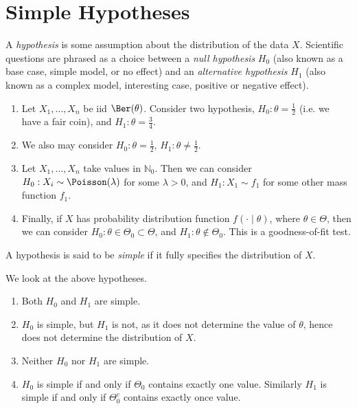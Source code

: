 \documentclass[12pt]{article}
\begin{document}
\newpage

\section{Simple Hypotheses}
\label{sec:simple_hypotheses}

A \emph{hypothesis} is some assumption about the distribution of the data $X$. Scientific questions are phrased as a choice between a \emph{null hypothesis} $H_0$ (also known as a base case, simple model, or no effect) and an \emph{alternative hypothesis} $H_1$ (also known as a complex model, interesting case, positive or negative effect).

\begin{exbox}
	\begin{enumerate}
	\item Let $X_1, \ldots, X_n$ be iid $\Ber(\theta)$. Consider two hypothesis, $H_0 : \theta = \frac{1}{2}$ (i.e. we have a fair coin), and $H_1 : \theta = \frac{3}{4}$.
	\item We also may consider $H_0 : \theta = \frac{1}{2}$, $H_1 : \theta \neq \frac{1}{2}$.
	\item Let $X_1, \ldots, X_n$ take values in $\mathbb{N}_{0}$. Then we can consider $H_0 : X_i \sim \Poisson(\lambda)$ for some $\lambda > 0$, and $H_1 : X_1 \sim f_1$ for some other mass function $f_1$.
	\item Finally, if $X$ has probability distribution function $f(\cdot \mid \theta)$, where $\theta \in \Theta$, then we can consider $H_0 : \theta \in \Theta_0 \subset \Theta$, and $H_1 : \theta \not \in \Theta_0$. This is a goodness-of-fit test.
	\end{enumerate}
\end{exbox}

A hypothesis is said to be \emph{simple} if it fully specifies the distribution of $X$.

\begin{exbox}
	We look at the above hypotheses.
	\begin{enumerate}
		\item Both $H_0$ and $H_1$ are simple.
		\item $H_0$ is simple, but $H_1$ is not, as it does not determine the value of $\theta$, hence does not determine the distribution of $X$.
		\item Neither $H_0$ nor $H_1$ are simple.
		\item $H_0$ is simple if and only if $\Theta_0$ contains exactly one value. Similarly $H_1$ is simple if and only if $\Theta_0^{c}$ contains exactly once value.
	\end{enumerate}
\end{exbox}
\end{document}
